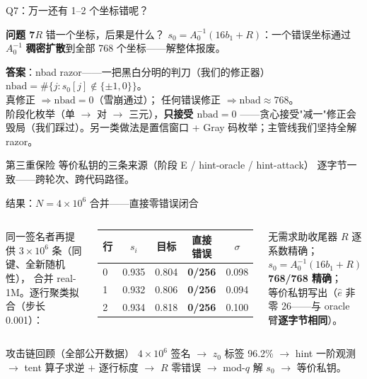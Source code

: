 \documentclass[11pt,aspectratio=169]{ctexbeamer}
\begin{document}
\begin{frame}{Q7：万一还有 1--2 个坐标错呢？}
  \begin{block}{\textbf{问题 7}\quad $R$ 错一个坐标，后果是什么？}
    \small $s_0 = A_0^{-1}(16b_1+R)$：一个错误坐标通过 $A_0^{-1}$
    \textbf{稠密扩散}到全部 768 个坐标——解整体报废。
  \end{block}
  \begin{exampleblock}{\textbf{答案}：nbad razor——一把黑白分明的判刀（我们的修正器）}
    \small $\mathrm{nbad}=\#\{j: s_0[j]\notin\{\pm1,0\}\}$。\\
    真修正 $\Rightarrow \mathrm{nbad}=0$（雪崩通过）；
    任何错误修正 $\Rightarrow \mathrm{nbad}\approx768$。\\
    阶段化枚举（单 $\to$ 对 $\to$ 三元），\textbf{只接受 $\mathrm{nbad}=0$}
    ——贪心接受"减一"修正会毁局（我们踩过）。另一类做法是置信窗口 + Gray 码枚举；主管线我们坚持全解 razor。
  \end{exampleblock}
  \begin{exampleblock}{第三重保险}
    \small 等价私钥的三条来源（阶段 E / hint-oracle / hint-attack）
    逐字节一致——跨轮次、跨代码路径。
  \end{exampleblock}
\end{frame}

\begin{frame}{结果：$N=4\times10^6$ 合并——直接零错误闭合}
  \begin{columns}[T]
    \small 同一签名者再提供 $3\times10^6$ 条（同键、全新随机性），
    合并 real-1M。逐行聚类拟合（步长 0.001）：
    \begin{center}
    \begin{tabular}{lcccc}
    \toprule
    行 & $s_i$ & 目标 & 直接错误 & $\sigma$\\
    \midrule
    0 & 0.935 & 0.804 & \textbf{0/256} & 0.098\\
    1 & 0.932 & 0.806 & \textbf{0/256} & 0.094\\
    2 & 0.934 & 0.818 & \textbf{0/256} & 0.100\\
    \bottomrule
    \end{tabular}
    \end{center}
    \begin{alertblock}{无需求助收尾器}
      \small $R$ 逐系数精确；\\
      $s_0 = A_0^{-1}(16b_1+R)$ \textbf{768/768 精确}；\\
      等价私钥写出（$\hat e$ 非零 26——与 oracle 臂\textbf{逐字节相同}）。
    \end{alertblock}
  \end{columns}
  \vspace{0.15em}
  \begin{block}{攻击链回顾（全部公开数据）}
    \small $4\times10^6$ 签名 $\to$ $z_0$ 标签 96.2\% $\to$ hint 一阶观测
    $\to$ tent 算子求逆 $+$ 逐行标度 $\to$ $R$ 零错误 $\to$ mod-$q$ 解 $s_0$
    $\to$ 等价私钥。
  \end{block}
\end{frame}
\end{document}

